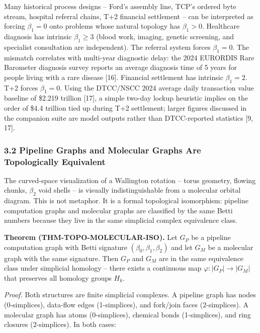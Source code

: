 \documentclass[
  11pt,
]{article}
\begin{document}
Many historical process designs -- Ford's assembly line, TCP's ordered
byte stream, hospital referral chains, T+2 financial settlement -- can
be interpreted as forcing \(\beta_1 = 0\) onto problems whose natural
topology has \(\beta_1 > 0\). Healthcare diagnosis has intrinsic
\(\beta_1 \geq 3\) (blood work, imaging, genetic screening, and
specialist consultation are independent). The referral system forces
\(\beta_1 = 0\). The mismatch correlates with multi-year diagnostic
delay: the 2024 EURORDIS Rare Barometer diagnosis survey reports an
average diagnosis time of 5 years for people living with a rare disease
{[}16{]}. Financial settlement has intrinsic \(\beta_1 = 2\). T+2 forces
\(\beta_1 = 0\). Using the DTCC/NSCC 2024 average daily transaction
value baseline of \$2.219 trillion {[}17{]}, a simple two-day lockup
heuristic implies on the order of \$4.4 trillion tied up during T+2
settlement; larger figures discussed in the companion suite are model
outputs rather than DTCC-reported statistics {[}9, 17{]}.

\subsubsection{3.2 Pipeline Graphs and Molecular Graphs Are
Topologically
Equivalent}\label{pipeline-graphs-and-molecular-graphs-are-topologically-equivalent}

The curved-space visualization of a Wallington rotation -- torus
geometry, flowing chunks, \(\beta_2\) void shells -- is visually
indistinguishable from a molecular orbital diagram. This is not
metaphor. It is a formal topological isomorphism: pipeline computation
graphs and molecular graphs are classified by the same Betti numbers
because they live in the same simplicial complex equivalence class.

\textbf{Theorem (THM-TOPO-MOLECULAR-ISO).} Let \(G_P\) be a pipeline
computation graph with Betti signature \((\beta_0, \beta_1, \beta_2)\)
and let \(G_M\) be a molecular graph with the same signature. Then
\(G_P\) and \(G_M\) are in the same equivalence class under simplicial
homology -- there exists a continuous map \(\varphi: |G_P| \to |G_M|\)
that preserves all homology groups \(H_k\).

\emph{Proof.} Both structures are finite simplicial complexes. A
pipeline graph has nodes (0-simplices), data-flow edges (1-simplices),
and fork/join faces (2-simplices). A molecular graph has atoms
(0-simplices), chemical bonds (1-simplices), and ring closures
(2-simplices). In both cases:
\end{document}
